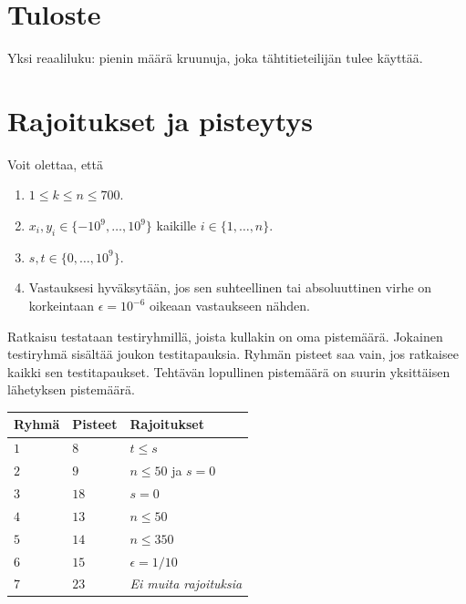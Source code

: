 \section*{Tuloste}

Yksi reaaliluku: pienin määrä kruunuja, joka tähtitieteilijän tulee käyttää.

\section*{Rajoitukset ja pisteytys} %

Voit olettaa, että
\begin{enumerate}
\item $1\leq k\leq n\leq 700$. %
\item $x_i, y_i\in \{-10^9,\ldots, 10^9\}$ kaikille $i\in\{1,\ldots,n\}$. %
\item $s,t\in \{0,\ldots, 10^9\}$. %
\item Vastauksesi hyväksytään, jos sen suhteellinen tai absoluuttinen virhe on korkeintaan $\epsilon = 10^{-6}$ oikeaan vastaukseen nähden.
\end{enumerate}


Ratkaisu testataan testiryhmillä, joista kullakin on oma pistemäärä.
Jokainen testiryhmä sisältää joukon testitapauksia.
Ryhmän pisteet saa vain, jos ratkaisee kaikki sen testitapaukset.
Tehtävän lopullinen pistemäärä on suurin yksittäisen lähetyksen pistemäärä.

\medskip
\noindent
\begin{tabular}{lll}
  Ryhmä & Pisteet & Rajoitukset\\\hline
  $1$ & $8$ &  $t\leq s$\\
  $2$ & $9$ & $n\le 50$ ja $s=0$\\
  $3$ & $18$ & $s=0$\\
  $4$ & $13$ & $n\leq 50$\\
  $5$ & $14$ & $n\leq 350$\\
  $6$ & $15$ & $\epsilon = 1/10$\\
  $7$ & $23$ & \emph{Ei muita rajoituksia}\\
\end{tabular}
